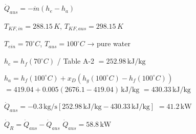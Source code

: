 \( \dot{Q}_{aus} = -\dot{m} (h_e - h_a) \)  

\( T_{KF,in} = 288.15 \, K \), \( T_{KF,aus} = 298.15 \, K \)  

\( T_{ein} = 70^\circ C \), \( T_{aus} = 100^\circ C \) → pure water  

\( h_e = h_f(70^\circ C) \) / Table A-2  
\( = 252.98 \, \text{kJ/kg} \)  

\( h_a = h_f(100^\circ C) + x_D (h_g(100^\circ C) - h_f(100^\circ C)) \)  
\( = 419.04 + 0.005 (2676.1 - 419.04) \, \text{kJ/kg} \)  
\( = 430.33 \, \text{kJ/kg} \)  

\( \dot{Q}_{aus} = -0.3 \, \text{kg/s} [252.98 \, \text{kJ/kg} - 430.33 \, \text{kJ/kg}] \)  
\( = 41.2 \, \text{kW} \)  

\( \dot{Q}_R = \dot{Q}_{aus} - \dot{Q}_{aus} \)  
\( \dot{Q}_{aus} = 58.8 \, \text{kW} \)